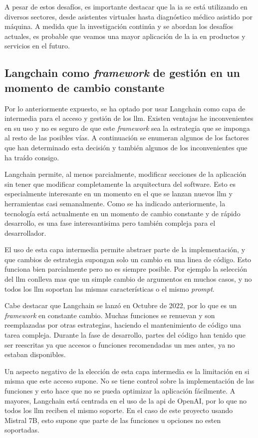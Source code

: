 A pesar de estos desafíos, es importante destacar que la \acrshort{ia} se está utilizando en diversos sectores, desde asistentes virtuales hasta diagnóstico médico asistido por máquina. A medida que la investigación continúa y se abordan los desafíos actuales, es probable que veamos una mayor aplicación de la \acrshort{ia} en productos y servicios en el futuro.

\subsection{Langchain como \textit{framework} de gestión en un momento de cambio constante}

Por lo anteriormente expuesto, se ha optado por usar Langchain como capa de intermedia para el acceso y gestión de los \acrshort{llm}. Existen ventajas he inconvenientes en su uso y no es seguro de que este \textit{framework} sea la estrategia que se imponga al resto de las posibles vías. A continuación se enumeran algunos de los factores que han determinado esta decisión y también algunos de los inconvenientes que ha traído consigo.

Langchain permite, al menos parcialmente, modificar secciones de la aplicación sin tener que modificar completamente la arquitectura del software. Esto es especialmente interesante en un momento en el que se lanzan nuevos \acrshort{llm} y herramientas casi semanalmente. Como se ha indicado anteriormente, la tecnología está actualmente en un momento de cambio constante y de rápido desarrollo, es una fase interesantisima pero también compleja para el desarrollador. 

El uso de esta capa intermedia permite abstraer parte de la implementación, y que cambios de estrategia supongan solo un cambio en una linea de código. Esto funciona bien parcialmente pero no es siempre posible. Por ejemplo la selección del \acrshort{llm} conlleva mas que un simple cambio de argumentos en muchos casos, y no todos los \acrshort{llm} soportan las mismas características o el mismo \textit{prompt}.

Cabe destacar que Langchain se lanzó en Octubre de 2022, por lo que es un \textit{framework} en constante cambio. Muchas funciones se renuevan y son reemplazadas por otras estrategias, haciendo el mantenimiento de código una tarea compleja. Durante la fase de desarrollo, partes del código han tenido que ser reescritas ya que accesos o funciones recomendadas un mes antes, ya no estaban disponibles.

Un aspecto negativo de la elección de esta capa intermedia es la limitación en si misma que este acceso supone. No se tiene control sobre la implementación de las funciones y esto hace que no se pueda optimizar la aplicación fácilmente. A mayores, Langchain está centrada en el uso de la \acrshort{api} de OpenAI, por lo que no todos los \acrshort{llm} reciben el mismo soporte. En el caso de este proyecto usando Mistral 7B, esto supone que parte de las funciones u opciones no esten soportadas.

